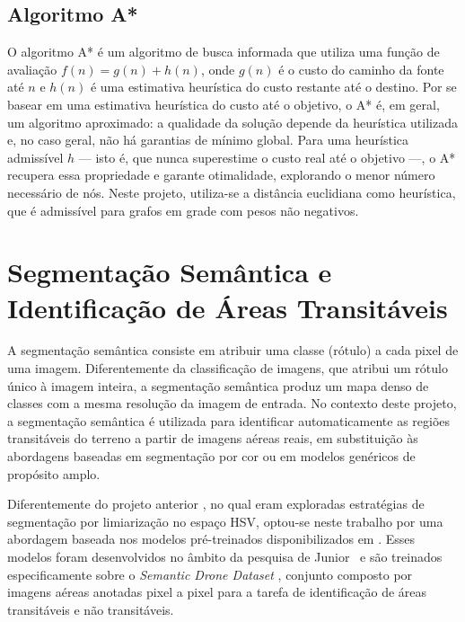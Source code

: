 \documentclass[
    12pt,
    openright,
    oneside,
    a4paper,
    english,
    brazil
]{abntex2}
\begin{document}
\subsection{Algoritmo A*}

O algoritmo A* \cite{hart1968} é um algoritmo de busca informada que utiliza uma função de avaliação $f(n) = g(n) + h(n)$, onde $g(n)$ é o custo do caminho da fonte até $n$ e $h(n)$ é uma estimativa heurística do custo restante até o destino. Por se basear em uma estimativa heurística do custo até o objetivo, o A* é, em geral, um algoritmo aproximado: a qualidade da solução depende da heurística utilizada e, no caso geral, não há garantias de mínimo global. Para uma heurística admissível $h$ --- isto é, que nunca superestime o custo real até o objetivo ---, o A* recupera essa propriedade e garante otimalidade, explorando o menor número necessário de nós. Neste projeto, utiliza-se a distância euclidiana como heurística, que é admissível para grafos em grade com pesos não negativos.

\section{Segmentação Semântica e Identificação de Áreas Transitáveis}
\label{sec:segmentacao}

A segmentação semântica consiste em atribuir uma classe (rótulo) a cada pixel de uma imagem. Diferentemente da classificação de imagens, que atribui um rótulo único à imagem inteira, a segmentação semântica produz um mapa denso de classes com a mesma resolução da imagem de entrada. No contexto deste projeto, a segmentação semântica é utilizada para identificar automaticamente as regiões transitáveis do terreno a partir de imagens aéreas reais, em substituição às abordagens baseadas em segmentação por cor ou em modelos genéricos de propósito amplo.

Diferentemente do projeto anterior \cite{camelo2025}, no qual eram exploradas estratégias de segmentação por limiarização no espaço HSV, optou-se neste trabalho por uma abordagem baseada nos modelos pré-treinados disponibilizados em \cite{junior2024_models}. Esses modelos foram desenvolvidos no âmbito da pesquisa de Junior~\cite{junior2024} e são treinados especificamente sobre o \emph{Semantic Drone Dataset} \cite{drone_dataset}, conjunto composto por imagens aéreas anotadas pixel a pixel para a tarefa de identificação de áreas transitáveis e não transitáveis.
\end{document}
